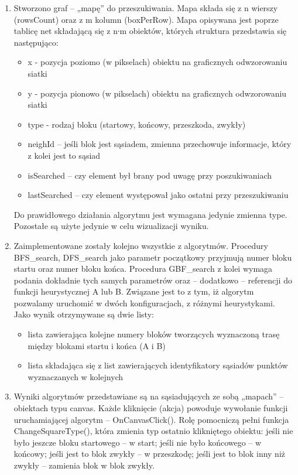 \documentclass{article}
\begin{document}
\begin{enumerate}
	\item Stworzono graf – „mapę” do przeszukiwania. Mapa składa się z n wierszy (rowsCount) oraz z m kolumn (boxPerRow). Mapa opisywana jest poprze tablicę net składającą się z n∙m obiektów, których struktura przedstawia się następująco: 
	\begin{itemize}

		\item x    - pozycja poziomo (w pikselach) obiektu na graficznych odwzorowaniu siatki
		\item y   - pozycja pionowo (w pikselach) obiektu na graficznych odwzorowaniu siatki
		\item type  - rodzaj bloku (startowy, końcowy, przeszkoda, zwykły)
		\item neighId – jeśli blok jest sąsiadem, zmienna przechowuje informacje, który z kolei jest to sąsiad
		\item isSearched – czy element był brany pod uwagę przy poszukiwaniach
		\item lastSearched – czy element występował jako ostatni przy przeszukiwaniu
	\end{itemize}
	Do prawidłowego działania algorytmu jest wymagana jedynie zmienna type.  Pozostałe są użyte jedynie w celu wizualizacji wyniku. 
	\item Zaimplementowane zostały kolejno wszystkie z algorytmów.
Procedury BFS{\_}search,  DFS{\_}search jako parametr początkowy przyjmują numer bloku startu oraz numer bloku końca. Procedura GBF{\_}search z kolei wymaga podania dokładnie tych samych parametrów oraz – dodatkowo – referencji do funkcji heurystycznej A lub B. Związane jest to z tym, iż algorytm pozwalamy uruchomić w dwóch konfiguracjach, z różnymi heurystykami. \\
Jako wynik otrzymywane są dwie listy:
	\begin{itemize}
		\item lista zawierająca kolejne numery bloków tworzących wyznaczoną trasę między blokami startu i końca (A i B)
		\item lista składająca się z list zawierających identyfikatory sąsiadów punktów wyznaczanych w kolejnych 
	\end{itemize}
	\item Wyniki algorytmów przedstawiane są na sąsiadujących ze sobą „mapach” – obiektach typu canvas. Każde kliknięcie (akcja) powoduje wywołanie funkcji uruchamiającej algorytm – OnCanvasClick(). Rolę pomocniczą pełni funkcja ChangeSquareType(), która zmienia typ ostatnio klikniętego obiektu: jeśli nie było jeszcze bloku startowego – w start; jeśli nie było końcowego – w końcowy; jeśli jest to blok zwykły – w przeszkodę; jeśli jest to blok inny niż zwykły – zamienia blok w blok zwykły. \\

\end{enumerate}
\end{document}
